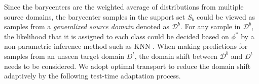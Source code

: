 \documentclass[journal]{IEEEtran}
\begin{document}
\label{methodSection:adaptive}
Since the barycenters are the weighted average of distributions from multiple source domains, the barycenter samples in the support set $S_b$ could be viewed as samples from a {\it generalized source domain} denoted as $\mathcal{D}^{b}$. 
For any sample in $\mathcal{D}^{b}$, the likelihood that it is assigned to each class could be decided based on $\phi^*$ %
by a non-parametric  inference method such as KNN \cite{zhu2020distributionally}. %
When making predictions for samples from an unseen target domain $D^t$, the domain shift between $\mathcal{D}^{b}$ and $D^t$ needs to be considered. We adopt optimal transport   to reduce the domain shift adaptively by the following test-time adaptation process.
\end{document}

